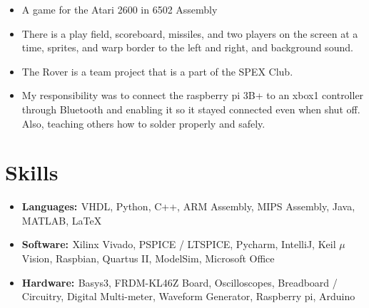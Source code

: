 \documentclass[a4paper]{comcv}
\begin{document}


    \begin{itemize}
        \item A game for the Atari 2600 in 6502 Assembly
        \item There is a play field, scoreboard, missiles, and two players on the screen at a time, sprites, and warp border to the left and right, and background sound.
\end{itemize}



    \begin{itemize}
        \item The Rover is a team project that is a part of the SPEX Club.
        \item My responsibility was to connect the raspberry pi 3B+ to an xbox1 controller through Bluetooth and enabling it so it stayed connected even when shut off. Also, teaching others how to solder properly and safely.
    \end{itemize}


\section{Skills}
\begin{itemize}
    \item {\bf{Languages: }}  {VHDL, Python, C++, ARM Assembly, MIPS Assembly, Java, MATLAB, \LaTeX} 
    
    \item {\bf{Software: }} {Xilinx Vivado, PSPICE / LTSPICE, Pycharm, IntelliJ, Keil $\mu$Vision, Raspbian, Quartus II, ModelSim, Microsoft Office}
    
    \item {\bf{Hardware: }}  {Basys3,  FRDM-KL46Z Board, Oscilloscopes, Breadboard / Circuitry, Digital Multi-meter, Waveform Generator, Raspberry pi, Arduino} 
\end{itemize}
\end{document}
